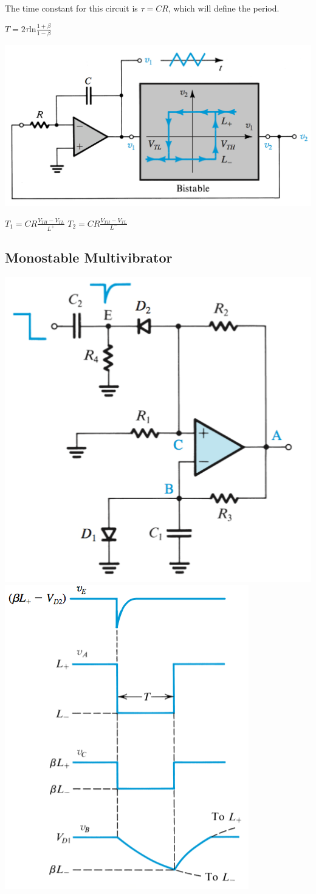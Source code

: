 \documentclass[11pt]{article}
\begin{document}
    The time constant for this circuit is $\tau = CR$, which will define the period.

    \begin{center}
        $T = 2\tau \text{ln}\frac{1+\beta}{1-\beta}$
    \end{center}

    \includegraphics[width = 350 px]{triangle}  
    
    \begin{center}
        $T_1 = CR\frac{V_{TH}-V_{TL}}{L^+}$
        $T_2 = CR\frac{V_{TH}-V_{TL}}{L^-}$
    \end{center}

    \subsection{Monostable Multivibrator}

    \includegraphics[width = 200 px]{mono} \includegraphics[width = 200 px]{mono-char}        
\end{document}
